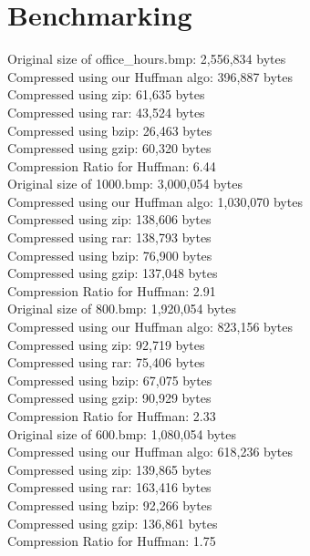\documentclass[12pt,letterpaper]{article}
\begin{document}
\section*{Benchmarking}

Original size of office\_hours.bmp: 2,556,834 bytes \\
Compressed using our Huffman algo: 396,887 bytes \\
Compressed using zip: 61,635 bytes \\
Compressed using rar: 43,524 bytes\\
Compressed using bzip: 26,463 bytes \\
Compressed using gzip: 60,320 bytes \\
Compression Ratio for Huffman: 6.44 \\

Original size of 1000.bmp: 3,000,054 bytes \\
Compressed using our Huffman algo: 1,030,070 bytes \\
Compressed using zip: 138,606 bytes \\
Compressed using rar: 138,793 bytes \\
Compressed using bzip: 76,900 bytes \\
Compressed using gzip: 137,048 bytes \\
Compression Ratio for Huffman: 2.91 \\

Original size of 800.bmp: 1,920,054 bytes \\
Compressed using our Huffman algo: 823,156 bytes \\
Compressed using zip: 92,719 bytes \\
Compressed using rar: 75,406 bytes \\
Compressed using bzip: 67,075 bytes \\
Compressed using gzip: 90,929 bytes \\
Compression Ratio for Huffman: 2.33 \\

Original size of 600.bmp: 1,080,054 bytes \\
Compressed using our Huffman algo: 618,236 bytes \\
Compressed using zip: 139,865 bytes \\
Compressed using rar: 163,416 bytes \\
Compressed using bzip: 92,266 bytes \\
Compressed using gzip: 136,861 bytes \\
Compression Ratio for Huffman: 1.75 \\
\end{document}

